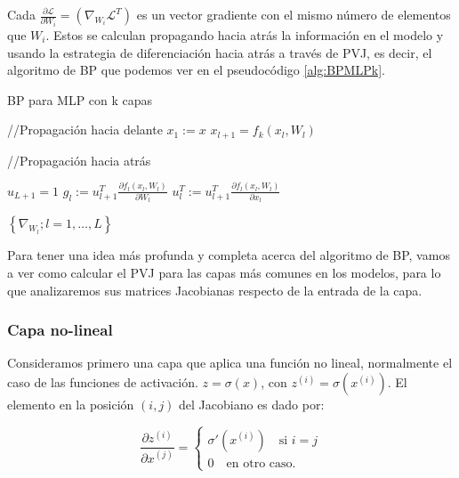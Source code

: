 Cada $\frac{\partial \mathcal{L}}{\partial W_i}= \left ( \nabla_{W_i} \mathcal{L}^T \right )$ es un vector gradiente con el mismo número de elementos que $W_i$. Estos se calculan propagando hacia atrás la información en el modelo y usando la estrategia de diferenciación hacia atrás a través de PVJ, es decir, el algoritmo de BP que podemos ver en el pseudocódigo \ref{alg:BPMLPk}. 



\begin{algorithm}
\caption{BP para MLP con k capas}
\label{alg:BPMLPk}
    \begin{algorithmic}
        \State //Propagación hacia delante
        \State $x_1:=x$
            \State $x_{l+1}=f_k(x_l, W_l)$
        \EndFor

        \State //Propagación hacia atrás

        \State $u_{L+1}=1$
            \State $g_l:= u_{l+1}^T \frac{\partial f_l(x_l, W_l)}{\partial W_l}$
            \State $u_l^T:=u_{l+1}^T\frac{\partial f_l(x_l, W_l)}{\partial x_l}$
        \EndFor
            

        \Return $\left \{  \nabla_{W_l}; l=1,\ldots,L \right \}$
    \end{algorithmic}
\end{algorithm}


Para tener una idea más profunda y completa acerca del algoritmo de BP, vamos a ver como calcular el PVJ para las capas más comunes en los modelos, para lo que analizaremos sus matrices Jacobianas respecto de la entrada de la capa. 



\subsubsection{Capa no-lineal}



Consideramos primero una capa que aplica una función no lineal, normalmente el caso de las funciones de activación. $z=\sigma(x)$, con $z^{(i)} = \sigma(x^{(i)})$. El elemento en la posición $(i,j)$ del Jacobiano es dado por:

$$ \frac{\partial z^{(i)}}{\partial x^{(j)}} =  \left\{\begin{matrix}

\sigma'(x^{(i)}) \quad \textrm{si } i=j  \\
0 \quad \textrm{en otro caso.}
\end{matrix}\right .
$$

